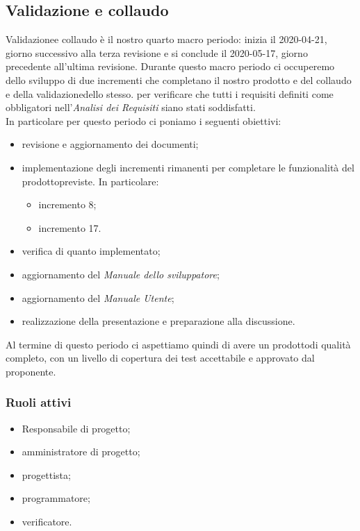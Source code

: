 \subsection{Validazione e collaudo}
Validazione\glosp e collaudo è il nostro quarto macro periodo: inizia il 2020-04-21, giorno successivo alla terza revisione e si conclude il 2020-05-17, giorno precedente all'ultima revisione. Durante questo macro periodo ci occuperemo dello sviluppo di due incrementi che completano il nostro prodotto e del collaudo e della validazione\glosp dello stesso. per verificare che tutti i requisiti definiti come obbligatori nell'\textit{Analisi dei Requisiti} siano stati soddisfatti. \\
In particolare per questo periodo ci poniamo i seguenti obiettivi:
\begin{itemize}
	\item revisione e aggiornamento dei documenti;	
	\item implementazione degli incrementi rimanenti per completare le funzionalità del prodotto\glosp previste. In particolare:
		\begin{itemize}
			\item incremento 8;
			\item incremento 17.
		\end{itemize}
	\item verifica di quanto implementato;
	\item aggiornamento del \textit{Manuale dello sviluppatore};
	\item aggiornamento del \textit{Manuale Utente};
	\item realizzazione della presentazione e preparazione alla discussione.	
\end{itemize}
Al termine di questo periodo ci aspettiamo quindi di avere un prodotto\glosp di qualità completo, con un livello di copertura dei test accettabile e approvato dal proponente. 

\subsubsection*{Ruoli attivi}
\begin{itemize}
	\item Responsabile di progetto\glo;
	\item amministratore di progetto\glo;
	\item progettista;
	\item programmatore;
	\item verificatore.
\end{itemize}

